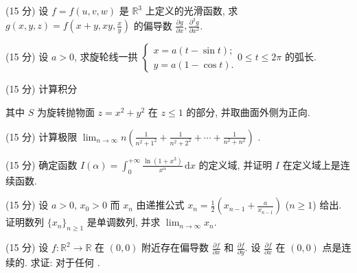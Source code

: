 (15 分) 设 $f = f(u, v, w)$ 是 $\mathbb{R}^3$ 上定义的光滑函数, 求 $g(x, y, z) = f\left(x + y, xy, \frac{x}{y}\right)$ 的偏导数 $\frac{\partial g}{\partial x}, \frac{\partial^2 g}{\partial x^2}$.\par
(15 分) 设 $a > 0$, 求旋轮线一拱 $\left\{ \begin{array}{l} x = a(t - \sin t); \\ y = a(1 - \cos t). \end{array} \right.$$0 \leq t \leq 2\pi$ 的弧长.\par
\par{}
(15 分) 计算积分\par
\nopagebreak[4]
其中 $S$ 为旋转抛物面 $z = x^{2} + y^{2}$ 在 $z \leq 1$ 的部分, 并取曲面外侧为正向.\par
(15 分) 计算极限  $\lim_{n\to\infty} n\left(\frac{1}{n^{2}+1^{2}}+\frac{1}{n^{2}+2^{2}}+\cdots+\frac{1}{n^{2}+n^{2}}\right)$ .\par
(15 分) 确定函数 $I(\alpha) = \int_{0}^{+\infty} \frac{\ln(1 + x^3)}{x^\alpha} \, \mathrm{d}x$ 的定义域, 并证明 $I$ 在定义域上是连续函数.\par
(15 分) 设 $a > 0$, $x_0 > 0$ 而 $x_n$ 由递推公式 $x_n = \frac{1}{2} \left( x_{n-1} + \frac{a}{x_{n-1}} \right)$ ($n \geq 1$) 给出. 证明数列 $\{x_n\}_{n \geq 1}$ 是单调数列, 并求 $\lim_{n \to \infty} x_n$.\par
(15 分) 设 $f: \mathbb{R}^2 \to \mathbb{R}$ 在 $(0,0)$ 附近存在偏导数 $\frac{\partial f}{\partial x}$ 和 $\frac{\partial f}{\partial y}$. 设 $\frac{\partial f}{\partial x}$ 在 $(0,0)$ 点是连续的. 求证: 对于任何 .\par
$$
